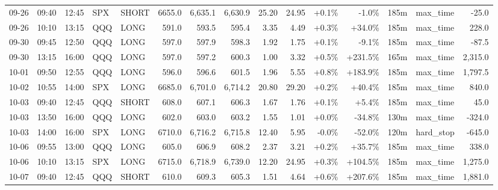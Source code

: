 \documentclass[11pt,a4paper,twoside]{article}
\begin{document}
\begin{landscape}
\begin{center}
\begin{longtable}{>{\color{txtmain}}l l l l l r r r r r r r r >{\color{txtmain}}l r}
09-26 & 09:40 & 12:45 & SPX & SHORT & 6655.0 & 6,635.1 & 6,630.9 & 25.20 & 24.95 & \textcolor{wingreen}{+0.1\%} & \textcolor{lossred}{-1.0\%} & 185m & max\_time & \textcolor{lossred}{-25.0} \\
09-26 & 10:10 & 13:15 & QQQ & LONG & 591.0 & 593.5 & 595.4 & 3.35 & 4.49 & \textcolor{wingreen}{+0.3\%} & \textcolor{wingreen}{+34.0\%} & 185m & max\_time & \textcolor{wingreen}{228.0} \\
09-30 & 09:45 & 12:50 & QQQ & LONG & 597.0 & 597.9 & 598.3 & 1.92 & 1.75 & \textcolor{wingreen}{+0.1\%} & \textcolor{lossred}{-9.1\%} & 185m & max\_time & \textcolor{lossred}{-87.5} \\
09-30 & 13:15 & 16:00 & QQQ & LONG & 597.0 & 597.2 & 600.3 & 1.00 & 3.32 & \textcolor{wingreen}{+0.5\%} & \textcolor{wingreen}{+231.5\%} & 165m & max\_time & \textcolor{wingreen}{2,315.0} \\
10-01 & 09:50 & 12:55 & QQQ & LONG & 596.0 & 596.6 & 601.5 & 1.96 & 5.55 & \textcolor{wingreen}{+0.8\%} & \textcolor{wingreen}{+183.9\%} & 185m & max\_time & \textcolor{wingreen}{1,797.5} \\
10-02 & 10:55 & 14:00 & SPX & LONG & 6685.0 & 6,701.0 & 6,714.2 & 20.80 & 29.20 & \textcolor{wingreen}{+0.2\%} & \textcolor{wingreen}{+40.4\%} & 185m & max\_time & \textcolor{wingreen}{840.0} \\
10-03 & 09:40 & 12:45 & QQQ & SHORT & 608.0 & 607.1 & 606.3 & 1.67 & 1.76 & \textcolor{wingreen}{+0.1\%} & \textcolor{wingreen}{+5.4\%} & 185m & max\_time & \textcolor{wingreen}{45.0} \\
10-03 & 13:50 & 16:00 & QQQ & LONG & 602.0 & 603.0 & 603.2 & 1.55 & 1.01 & \textcolor{wingreen}{+0.0\%} & \textcolor{lossred}{-34.8\%} & 130m & max\_time & \textcolor{lossred}{-324.0} \\
10-03 & 14:00 & 16:00 & SPX & LONG & 6710.0 & 6,716.2 & 6,715.8 & 12.40 & 5.95 & \textcolor{lossred}{-0.0\%} & \textcolor{lossred}{-52.0\%} & 120m & hard\_stop & \textcolor{lossred}{-645.0} \\
10-06 & 09:55 & 13:00 & QQQ & LONG & 605.0 & 606.9 & 608.2 & 2.37 & 3.21 & \textcolor{wingreen}{+0.2\%} & \textcolor{wingreen}{+35.7\%} & 185m & max\_time & \textcolor{wingreen}{338.0} \\
10-06 & 10:10 & 13:15 & SPX & LONG & 6715.0 & 6,718.9 & 6,739.0 & 12.20 & 24.95 & \textcolor{wingreen}{+0.3\%} & \textcolor{wingreen}{+104.5\%} & 185m & max\_time & \textcolor{wingreen}{1,275.0} \\
10-07 & 09:40 & 12:45 & QQQ & SHORT & 610.0 & 609.3 & 605.3 & 1.51 & 4.64 & \textcolor{wingreen}{+0.6\%} & \textcolor{wingreen}{+207.6\%} & 185m & max\_time & \textcolor{wingreen}{1,881.0} \\

\end{longtable}
\end{center}
\end{landscape}
\end{document}
